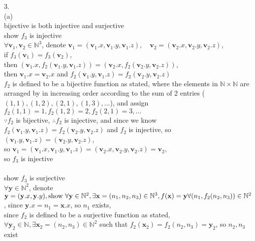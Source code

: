 \documentclass[12pt, border = 4pt, multi]{article} %
\begin{document}
3.\\
(a)\\
bijective is both injective and surjective\\
show $f_3$ is injective\\
$\forall \textbf{v}_1, \textbf{v}_2 \in \mathbb{N} ^ 3$, denote $\textbf{v}_1 = (\textbf{v}_1.x, \textbf{v}_1.y, \textbf{v}_1.z), \quad\textbf{v}_2 = (\textbf{v}_2.x, \textbf{v}_2.y, \textbf{v}_2.z)$,\\
if $f_3(\textbf{v}_1) = f_3(\textbf{v}_2)$,\\
then $(\textbf{v}_1.x, f_2(\textbf{v}_1.y, \textbf{v}_1.z)) = (\textbf{v}_2.x, f_2(\textbf{v}_2.y, \textbf{v}_2.z))$,\\
then $\textbf{v}_1.x = \textbf{v}_2.x$ and $f_2(\textbf{v}_1.y, \textbf{v}_1.z) = f_2(\textbf{v}_2.y, \textbf{v}_2.z)$\\
$f_2$ is defined to be a bijective function as stated, where the elements in $\mathbb{N} \times \mathbb{N}$ are arranged by in increasing order according to the sum of 2 entries ($(1, 1), (1, 2), (2, 1), (1, 3), ...$), and assign $f_2(1, 1) = 1, f_2(1, 2) = 2, f_2(2, 1) = 3, ...$\\
$\because f_2$ is bijective, $\therefore f_2$ is injective, and since we know $f_2(\textbf{v}_1.y, \textbf{v}_1.z) = f_2(\textbf{v}_2.y, \textbf{v}_2.z)$ and $f_2$ is injective, so $(\textbf{v}_1.y, \textbf{v}_1.z) = (\textbf{v}_2.y, \textbf{v}_2.z)$,\\
so $\textbf{v}_1 = (\textbf{v}_1.x, \textbf{v}_1.y, \textbf{v}_1.z) = (\textbf{v}_2.x, \textbf{v}_2.y, \textbf{v}_2.z) = \textbf{v}_2$,\\
so $f_3$ is injective\\
\\
show $f_3$ is surjective\\
$\forall \textbf{y} \in \mathbb{N} ^ 2$, denote $\textbf{y} = (\textbf{y}.x, \textbf{y}.y),\\
\text{show }\forall \textbf{y} \in \mathbb{N} ^ 2, \exists \textbf{x} = (n_1, n_2, n_3)\in \mathbb{N} ^ 3, f(\textbf{x}) = \textbf{y}\\
\forall (n_1, f_2(n_2, n_3)) \in \mathbb{N} ^ 2$, since $\textbf{y}.x = n_1 = \textbf{x}.x$, so $n_1$ exists,\\
since $f_2$ is defined to be a surjective function as stated, $\forall \textbf{y}_2 \in \mathbb{N}, \exists \textbf{x}_2 = (n_2, n_3) \in \mathbb{N} ^ 2$ such that $f_2(\textbf{x}_2) = f_2(n_2, n_3) = \textbf{y}_2$, so $n_2, n_3$ exist\\
\end{document}
